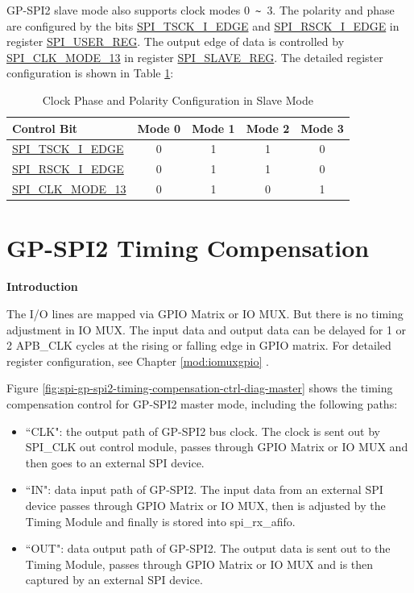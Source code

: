 \documentclass[main\_\_EN.tex]{subfiles}
\begin{document}
GP-SPI2 slave mode also supports clock modes 0\verb+ ~ +3. The polarity and phase are configured by the bits \hyperref[fielddesc:SPITSCKIEDGE]{SPI\_TSCK\_I\_EDGE} and \hyperref[fielddesc:SPIRSCKIEDGE]{SPI\_RSCK\_I\_EDGE} in register \hyperref[regdesc:SPIUSERREG]{SPI\_USER\_REG}. The output edge of data is controlled by \hyperref[fielddesc:SPICLKMODE13]{SPI\_CLK\_MODE\_13} in register \hyperref[regdesc:SPISLAVEREG]{SPI\_SLAVE\_REG}. The detailed register configuration is shown in Table \ref{tab:spi-clk-phase-polarity-config-slave}:

\begin{table}[H]
    \centering
    \caption{Clock Phase and Polarity Configuration in Slave Mode}
    \label{tab:spi-clk-phase-polarity-config-slave}
    \begin{tabular}[c]{|p{3.5cm}|c|c|c|c|}
    \hline
    \rowcolor{lightgray}
    \textbf{Control Bit} & \textbf{Mode 0} & \textbf{Mode 1} & \textbf{Mode 2} & \textbf{Mode 3}\\
    \hline
    \hyperref[fielddesc:SPITSCKIEDGE]{SPI\_TSCK\_I\_EDGE}   & 0 & 1 & 1 & 0\\
    \hline
    \hyperref[fielddesc:SPIRSCKIEDGE]{SPI\_RSCK\_I\_EDGE}   & 0 & 1 & 1 & 0\\
    \hline
    \hyperref[fielddesc:SPICLKMODE13]{SPI\_CLK\_MODE\_13}     & 0 & 1 & 0 & 1\\
    \hline
    \end{tabular}
\end{table}


\section{GP-SPI2 Timing Compensation} \label{sec:spi-gp-spi2-timing-compensation}

\textbf{Introduction}

The I/O lines are mapped via GPIO Matrix or IO MUX. But there is no timing adjustment in IO MUX. The input data and output data can be delayed for 1 or 2 APB\_CLK cycles at the rising or falling edge in GPIO matrix. For detailed register configuration, see Chapter \ref{mod:iomuxgpio} \textit{}.

Figure \ref{fig:spi-gp-spi2-timing-compensation-ctrl-diag-master} shows the timing compensation control for GP-SPI2 master mode, including the following paths:
\begin{itemize}
    \item ``CLK": the output path of GP-SPI2 bus clock. The clock is sent out by SPI\_CLK out control module, passes through GPIO Matrix or IO MUX and then goes to an external SPI device.

    \item ``IN": data input path of GP-SPI2. The input data from an external SPI device passes through GPIO Matrix or IO MUX, then is adjusted by the Timing Module and finally is stored into spi\_rx\_afifo.

    \item ``OUT": data output path of GP-SPI2. The output data is sent out to the Timing Module, passes through GPIO Matrix or IO MUX and is then captured by an external SPI device.
\end{itemize}
\end{document}
